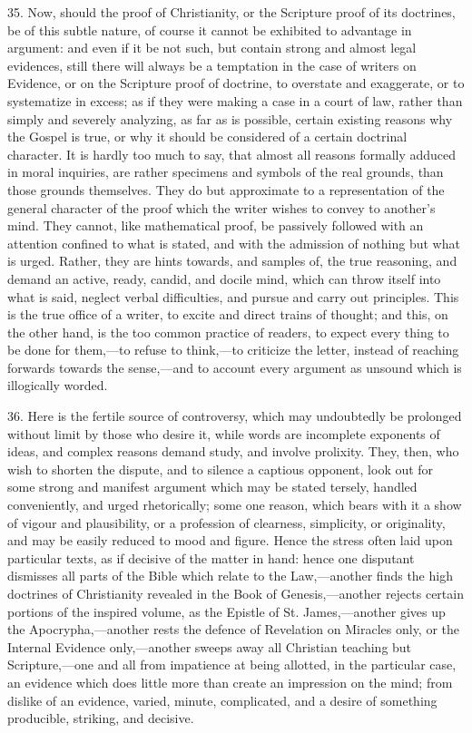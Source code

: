 35. Now, should the proof of Christianity, or the Scripture proof
of its doctrines, be of this subtle nature, of course it cannot be
exhibited to advantage in argument: and even if it be not such, but
contain strong and almost legal evidences, still there will always be
a temptation in the case of writers on Evidence, or on the Scripture
proof of doctrine, to overstate and exaggerate, or to systematize in
excess; as if they were making a case in a court of law, rather than
simply and severely analyzing, as far as is possible, certain existing
reasons why the Gospel is true, or why it should be considered of a
certain doctrinal character. It is hardly too much to say, that almost
all reasons formally adduced in moral inquiries, are rather specimens
and symbols of the real grounds, than those grounds themselves. They
do but approximate to a representation of the general character of the
proof which the writer wishes to convey to another's mind. They
cannot, like mathematical proof, be passively followed with an
attention confined to what is stated, and with the admission of
nothing but what is urged. Rather, they are hints towards, and samples
of, the true reasoning, and demand an active, ready, candid, and
docile mind, which can throw itself into what is said, neglect verbal
difficulties, and pursue and carry out principles. This is the true
office of a writer, to excite and direct trains of thought; and this,
on the other hand, is the too common practice of readers, to expect
every thing to be done for them,—to refuse to think,—to criticize
the letter, instead of reaching forwards towards the sense,—and to
account every argument as unsound which is illogically worded.

36. Here is the fertile source of controversy, which may
undoubtedly be prolonged without limit by those who desire it, while
words are incomplete exponents of ideas, and complex reasons demand
study, and involve prolixity. They, then, who wish to shorten the
dispute, and to silence a captious opponent, look out for some strong
and manifest argument which may be stated tersely, handled
conveniently, and urged rhetorically; some one reason, which bears
with it a show of vigour and plausibility, or a profession of
clearness, simplicity, or originality, and may be easily reduced to
mood and figure. Hence the stress often laid upon particular texts, as
if decisive of the matter in hand: hence one disputant dismisses all
parts of the Bible which relate to the Law,—another finds the high
doctrines of Christianity revealed in the Book of Genesis,—another
rejects certain portions of the inspired volume, as the Epistle of St.
James,—another gives up the Apocrypha,—another rests the defence
of Revelation on Miracles only, or the Internal Evidence only,—another
sweeps away all Christian teaching but Scripture,—one and all from
impatience at being allotted, in the particular case, an evidence
which does little more than create an impression on the mind; from
dislike of an evidence, varied, minute, complicated, and a desire of
something producible, striking, and decisive.

